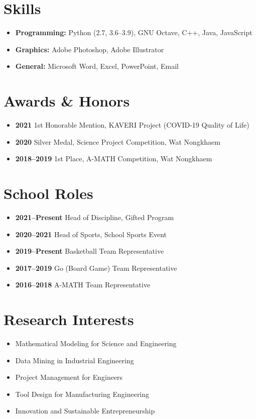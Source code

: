 \documentclass[a4paper,11pt]{article}
\newcommand{\sectiontitle}[1]{\section*{#1}}
\newcommand{\entry}[2]{\textbf{#1} \hfill #2 \\}
\begin{document}
\sectiontitle{Skills}
\begin{itemize}[leftmargin=*]
    \item \textbf{Programming:} Python (2.7, 3.6--3.9), GNU Octave, C++, Java, JavaScript
    \item \textbf{Graphics:} Adobe Photoshop, Adobe Illustrator
    \item \textbf{General:} Microsoft Word, Excel, PowerPoint, Email
\end{itemize}

\sectiontitle{Awards \& Honors}
\begin{itemize}[leftmargin=*,label={}]
    \item \entry{2021}{1st Honorable Mention, KAVERI Project (COVID-19 Quality of Life)}
    \item \entry{2020}{Silver Medal, Science Project Competition, Wat Nongkhaem}
    \item \entry{2018--2019}{1st Place, A-MATH Competition, Wat Nongkhaem}
\end{itemize}

\sectiontitle{School Roles}
\begin{itemize}[leftmargin=*,label={}]
    \item \entry{2021--Present}{Head of Discipline, Gifted Program}
    \item \entry{2020--2021}{Head of Sports, School Sports Event}
    \item \entry{2019--Present}{Basketball Team Representative}
    \item \entry{2017--2019}{Go (Board Game) Team Representative}
    \item \entry{2016--2018}{A-MATH Team Representative}
\end{itemize}

\sectiontitle{Research Interests}
\begin{itemize}[leftmargin=*]
    \item Mathematical Modeling for Science and Engineering
    \item Data Mining in Industrial Engineering
    \item Project Management for Engineers
    \item Tool Design for Manufacturing Engineering
    \item Innovation and Sustainable Entrepreneurship
\end{itemize}
\end{document}

